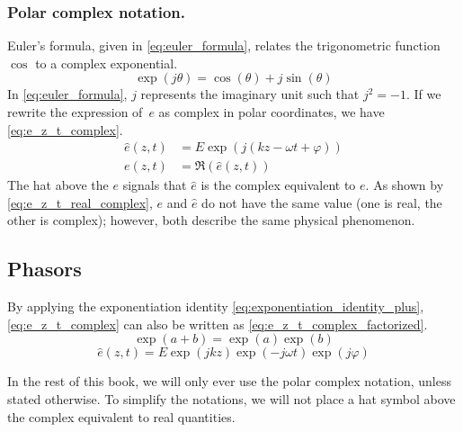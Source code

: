 \subsubsection{Polar complex notation.}
\label{sec:polar_complex_notation}
Euler's formula, given in \cref{eq:euler_formula}, relates the trigonometric function $\cos$ to a complex exponential.
\begin{equation}    
    \exp(j\theta) = \cos(\theta) + j\sin(\theta) \label{eq:euler_formula}
\end{equation}
In \cref{eq:euler_formula}, $j$ represents the imaginary unit such that $j^2=-1$.
If we rewrite the expression of~$e$ as complex in polar coordinates, we have \cref{eq:e_z_t_complex}.
\begin{align}
   \hat{e}(z, t) &= E \exp(j(kz - \omega t + \varphi))
   \label{eq:e_z_t_complex}
   \\
   e(z, t) &= \Re(\hat{e}(z, t))
   \label{eq:e_z_t_real_complex}
\end{align}
The hat above the $e$ signals that $\hat{e}$ is the complex equivalent to $e$.
As shown by \cref{eq:e_z_t_real_complex}, $e$ and $\hat{e}$ do not have the same value (one is real, the other is complex);
however, both describe the same physical phenomenon.


\subsection{Phasors}

By applying the exponentiation identity \cref{eq:exponentiation_identity_plus},
\cref{eq:e_z_t_complex} can also be written as \cref{eq:e_z_t_complex_factorized}.
\begin{equation}
    \exp(a+b) = \exp(a) \exp(b)
    \label{eq:exponentiation_identity_plus}
\end{equation}
\begin{equation}
    \hat{e}(z, t)
    =
    E \exp(jkz) \exp(-j\omega t) \exp(j\varphi)
    \label{eq:e_z_t_complex_factorized}
\end{equation}

In the rest of this book, we will only ever use the polar complex notation, unless stated otherwise.
To simplify the notations, we will not place a hat symbol above the complex equivalent to real quantities.

